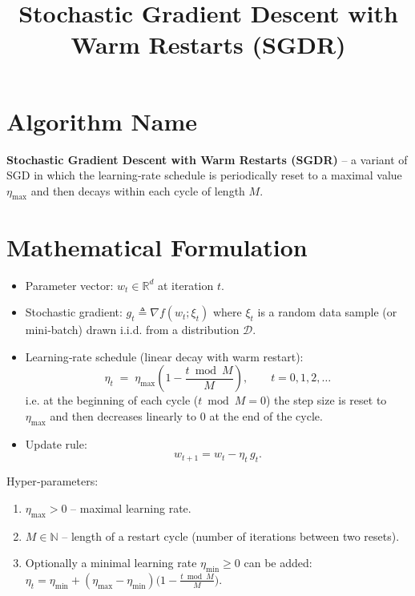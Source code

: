 \documentclass{article}
\newcommand{\R}{\mathbb{R}}
\begin{document}
\title{Stochastic Gradient Descent with Warm Restarts (SGDR)}
\author{}
\date{}
\maketitle

\section*{Algorithm Name}
\textbf{Stochastic Gradient Descent with Warm Restarts (SGDR)} – a variant of SGD in which the learning‑rate schedule is periodically reset to a maximal value $\eta_{\max }$ and then decays within each cycle of length $M$.

\section*{Mathematical Formulation}
\begin{itemize}
    \item Parameter vector: $w_t\in\R^d$ at iteration $t$.
    \item Stochastic gradient: $g_t\triangleq\nabla f(w_t;\xi_t)$ where $\xi_t$ is a random data sample (or mini‑batch) drawn i.i.d. from a distribution $\mathcal{D}$.
    \item Learning‑rate schedule (linear decay with warm restart):
    \[
        \eta_t \;=\;
        \eta_{\max}\!\left(1-\frac{t\bmod M}{M}\right),
        \qquad t=0,1,2,\dots
    \tag{1}
    \]
    i.e. at the beginning of each cycle ($t\bmod M=0$) the step size is reset to $\eta_{\max}$ and then decreases linearly to $0$ at the end of the cycle.
    \item Update rule:
    \[
        w_{t+1}=w_t-\eta_t\,g_t .
    \tag{2}
    \]
\end{itemize}
Hyper‑parameters:
\begin{enumerate}[label=\arabic*)]
    \item $\eta_{\max}>0$ – maximal learning rate.
    \item $M\in\mathbb{N}$ – length of a restart cycle (number of iterations between two resets).
    \item Optionally a minimal learning rate $\eta_{\min}\ge0$ can be added:
    $\eta_t=\eta_{\min}+(\eta_{\max}-\eta_{\min})\!\bigl(1-\frac{t\bmod M}{M}\bigr)$.
\end{enumerate}
\end{document}
